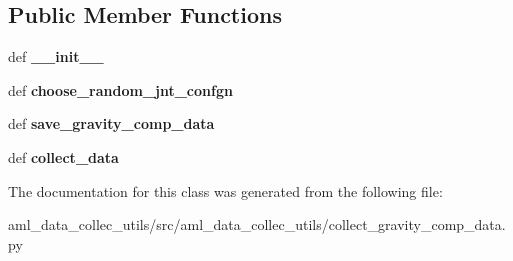 \subsection*{Public Member Functions}
\begin{DoxyCompactItemize}
\item 
\hypertarget{classaml__data__collec__utils_1_1collect__gravity__comp__data_1_1_collect_gravity_comp_data_a8aa32b7a731c729f1877dbfc62a783f4}{def {\bfseries \-\_\-\-\_\-init\-\_\-\-\_\-}}\label{classaml__data__collec__utils_1_1collect__gravity__comp__data_1_1_collect_gravity_comp_data_a8aa32b7a731c729f1877dbfc62a783f4}

\item 
\hypertarget{classaml__data__collec__utils_1_1collect__gravity__comp__data_1_1_collect_gravity_comp_data_a3d3a2a0a3ff135d2b6eeaae9d55584b0}{def {\bfseries choose\-\_\-random\-\_\-jnt\-\_\-confgn}}\label{classaml__data__collec__utils_1_1collect__gravity__comp__data_1_1_collect_gravity_comp_data_a3d3a2a0a3ff135d2b6eeaae9d55584b0}

\item 
\hypertarget{classaml__data__collec__utils_1_1collect__gravity__comp__data_1_1_collect_gravity_comp_data_a54d0e4064ca431e0058a245baca69fc9}{def {\bfseries save\-\_\-gravity\-\_\-comp\-\_\-data}}\label{classaml__data__collec__utils_1_1collect__gravity__comp__data_1_1_collect_gravity_comp_data_a54d0e4064ca431e0058a245baca69fc9}

\item 
\hypertarget{classaml__data__collec__utils_1_1collect__gravity__comp__data_1_1_collect_gravity_comp_data_aa064cc13fbe37a5420e669f1db6420b1}{def {\bfseries collect\-\_\-data}}\label{classaml__data__collec__utils_1_1collect__gravity__comp__data_1_1_collect_gravity_comp_data_aa064cc13fbe37a5420e669f1db6420b1}

\end{DoxyCompactItemize}


The documentation for this class was generated from the following file\-:\begin{DoxyCompactItemize}
\item 
aml\-\_\-data\-\_\-collec\-\_\-utils/src/aml\-\_\-data\-\_\-collec\-\_\-utils/collect\-\_\-gravity\-\_\-comp\-\_\-data.\-py\end{DoxyCompactItemize}
